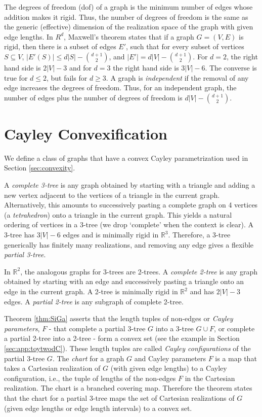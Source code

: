 \documentclass[]{article}
\begin{document}
The degrees of freedom (dof) of a graph is the minimum number of
edges whose addition makes it rigid. Thus, the number of degrees of freedom is
the same as the generic (effective) dimension of the realization space of the
graph with given edge lengths. In $R^d$, Maxwell's theorem
\cite{maxwell} states that if a graph $G=(V,E)$ is rigid, then there is a
subset of edges $E'$, such that for every subset of vertices $S \subseteq V$,
$|E'(S)| \le d|S| - {d+1 \choose 2}$, and $|E'| = d|V| - {d+1 \choose 2}$.
For $d=2$, the right hand side is $2|V| -3$ and for $d=3$ the right hand
side is $3|V|-6$.
The converse is true for $d\le2$, but fails for $d\ge3$.
A graph is \emph{independent} if the removal of any edge increases the degrees 
of freedom. Thus, for an independent graph, the number of edges plus
the number of degrees of freedom is $d|V| - {d+1 \choose 2}$.

\section{Cayley Convexification}
\label{sec:app:convexity}

We define a class of graphs that have 
a convex Cayley parametrization used in Section \ref{sec:convexity}.

A \emph{complete 3-tree} is any graph obtained by starting with a triangle and
adding a new vertex adjacent to the vertices of a triangle in the current
graph. Alternatively, this amounts to successively pasting a complete graph on
4 vertices (a \emph{tetrahedron}) onto a triangle in the current graph. This
yields a natural ordering of vertices in a 3-tree (we drop `complete' when the
context is clear). A 3-tree has $3|V| -6$ edges and
is minimally rigid in $\mathbb{R}^3$. Therefore, a 3-tree generically has
finitely many realizations, and removing any edge gives a flexible
\emph{partial 3-tree}. 

In $\mathbb{R}^2$, the analogous graphs for 3-trees are 2-trees. A
\emph{complete 2-tree} is any graph obtained by starting with an edge and
successively pasting a triangle onto an edge in the current graph. 
A 2-tree is minimally rigid in $\mathbb{R}^2$ and has $2|V| -3$ edges.
A \emph{partial 2-tree} is any subgraph of complete 2-tree.

Theorem \ref{thm:SiGa} asserts that the length tuples of non-edges or \emph{Cayley parameters}, 
$F$ - that complete a partial 3-tree $G$ into a 3-tree $G\cup F$, or complete a partial 2-tree into a 2-tree - form a convex set
(see the example in Section \ref{sec:app:toytwodC}).
These length tuples are called \emph{Cayley configurations} of the partial 3-tree $G$. The \emph{chart} for a graph $G$ and 
Cayley parameters $F$ is a map that takes a Cartesian realization of $G$ (with given edge lengths)
to a Cayley configuration, i.e., the tuple of lengths of the non-edges $F$ in the Cartesian realization.
The chart is a branched covering map. Therefore the theorem states that the chart for a partial
3-tree maps the set of Cartesian realizations of $G$ (given edge lengths or edge length intervals) to a convex set.
\end{document}
